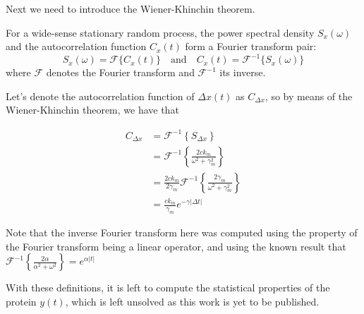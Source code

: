 Next we need to introduce the Wiener-Khinchin theorem.

\begin{untheorem}
    For a wide-sense stationary random process, the power spectral density $S_x(\omega)$ and the autocorrelation function $C_x(t)$ form a Fourier transform pair:
    $$
    S_x(\omega) = \mathcal{F}\{C_x(t)\} \quad \text{and} \quad C_x(t) = \mathcal{F}^{-1}\{S_x(\omega)\}
    $$
    where $\mathcal{F}$ denotes the Fourier transform and $\mathcal{F}^{-1}$ its inverse.
\end{untheorem}

Let's denote the autocorrelation function of $\Delta x(t)$ as $C_{\Delta x}$, so by means of the Wiener-Khinchin theorem, we have that

\begin{align*}
C_{\Delta x} &= \mathcal{F}^{-1}\left\{S_{\Delta x}\right\}\\
&= \mathcal{F}^{-1}\left\{\frac{2ck_m}{\omega^2+\gamma_m^2}\right\}\\
&= \frac{2ck_m}{2\gamma_m}\mathcal{F}^{-1}\left\{\frac{2\gamma_m}{\omega^2+\gamma_m^2}\right\}\\
&= \frac{ck_m}{\gamma_m}e^{-\gamma\left\lvert \Delta t\right\rvert}
\end{align*}

Note that the inverse Fourier transform here was computed using the property of the Fourier transform being a linear operator, and using the known result that $\mathcal{F}^{-1}\left\{\frac{2\alpha}{\alpha^2 + \omega^2}\right\} = e^{\alpha\left\lvert t\right\rvert}$

With these definitions, it is left to compute the statistical properties of the protein $y(t)$, which is left unsolved as this work is yet to be published.


